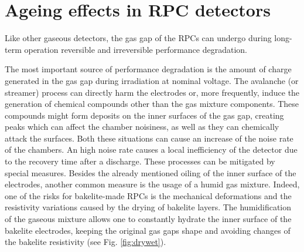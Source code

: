 

\section{Ageing effects in RPC detectors}
Like other gaseous detectors, the gas gap of the RPCs can undergo during long-term operation reversible and irreversible performance degradation.

The most important source of performance degradation is the amount of charge generated in the gas gap during irradiation at nominal voltage.
The avalanche (or streamer) process can directly harm the electrodes or, more frequently, induce the generation of chemical compounds other than the gas mixture components.
These compounds might form deposits on the inner surfaces of the gas gap, creating peaks which can affect the chamber noisiness, as well as they can chemically attack the surfaces.
Both these situations can cause an increase of the noise rate of the chambers.
An high noise rate causes a local inefficiency of the detector due to the recovery time after a discharge.
These processes can be mitigated by special measures.
Besides the already mentioned oiling of the inner surface  of the electrodes, another common measure is the usage of a humid gas mixture.
Indeed, one of the risks for bakelite-made RPCs is the mechanical deformations and the resistivity variations caused by the drying of bakelite layers.
The humidification of the gaseous mixture allows one to constantly hydrate the inner surface of the bakelite electrodes, keeping the original gas gaps shape and avoiding changes of the bakelite resistivity (see Fig. \ref{fig:drywet}).

